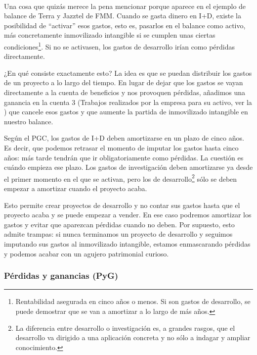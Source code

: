 \documentclass[nochap,palatino,shortheader]{apuntes}
\begin{document}
\paragraph{} Una cosa que quizás merece la pena mencionar porque aparece en el ejemplo de balance de Terra y Jazztel de FMM. Cuando se gasta dinero en I+D, existe la posibilidad de ``activar'' esos gastos, esto es, pasarlos en el balance como activo, más concretamente inmovilizado intangible si se cumplen unas ciertas condiciones\footnote{Rentabilidad asegurada en cinco años o menos. Si son gastos de desarrollo, se puede demostrar que se van a amortizar a lo largo de más años.}. Si no se activasen, los gastos de desarrollo irían como pérdidas directamente.

¿En qué consiste exactamente esto? La idea es que se puedan distribuir los gastos de un proyecto a lo largo del tiempo. En lugar de dejar que los gastos se vayan directamente a la cuenta de beneficios y nos provoquen pérdidas, añadimos una ganancia en la cuenta 3 (Trabajos realizados por la empresa para su activo, ver la ) que cancele esos gastos y que aumente la partida de inmovilizado intangible en nuestro balance.

Según el PGC, los gastos de I+D deben amortizarse en un plazo de cinco años. Es decir, que podemos retrasar el momento de imputar los gastos hasta cinco años: más tarde tendrán que ir obligatoriamente como pérdidas. La cuestión es cuándo empieza ese plazo. Los gastos de investigación deben amortizarse ya desde el primer momento en el que se activan, pero los de desarrollo\footnote{La diferencia entre desarrollo o investigación es, a grandes rasgos, que el desarrollo va dirigido a una aplicación concreta y no sólo a indagar y ampliar conocimiento.} sólo se deben empezar a amortizar cuando el proyecto acaba.

Esto permite crear proyectos de desarrollo y no contar sus gastos hasta que el proyecto acaba y se puede empezar a vender. En ese caso podremos amortizar los gastos y evitar que aparezcan pérdidas cuando no deben. Por supuesto, esto admite trampas: si nunca terminamos un proyecto de desarrollo y seguimos imputando sus gastos al inmovilizado intangible, estamos enmascarando pérdidas y podemos acabar con un agujero patrimonial curioso.

\subsubsection{Pérdidas y ganancias (PyG)}
\end{document}
